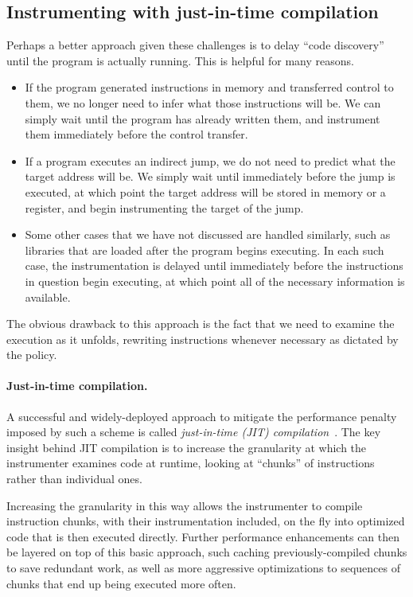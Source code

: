 \documentclass[11pt,twoside]{scrartcl}
\begin{document}
\subsection{Instrumenting with just-in-time compilation}
Perhaps a better approach given these challenges is to delay ``code discovery'' until the program is actually running. This is helpful for many reasons.
\begin{itemize}
\item If the program generated instructions in memory and transferred control to them, we no longer need to infer what those instructions will be. We can simply wait until the program has already written them, and instrument them immediately before the control transfer.
\item If a program executes an indirect jump, we do not need to predict what the target address will be. We simply wait until immediately before the jump is executed, at which point the target address will be stored in memory or a register, and begin instrumenting the target of the jump.
\item Some other cases that we have not discussed are handled similarly, such as libraries that are loaded after the program begins executing. In each such case, the instrumentation is delayed until immediately before the instructions in question begin executing, at which point all of the necessary information is available.
\end{itemize}
The obvious drawback to this approach is the fact that we need to examine the execution as it unfolds, rewriting instructions whenever necessary as dictated by the policy.

\paragraph{Just-in-time compilation.} A successful and widely-deployed approach to mitigate the performance penalty imposed by such a scheme is called \emph{just-in-time (JIT) compilation}~\cite{Aycock2003}. The key insight behind JIT compilation is to increase the granularity at which the instrumenter examines code at runtime, looking at ``chunks'' of instructions rather than individual ones. 

Increasing the granularity in this way allows the instrumenter to compile instruction chunks, with their instrumentation included, on the fly into optimized code that is then executed directly. Further performance enhancements can then be layered on top of this basic approach, such caching previously-compiled chunks to save redundant work, as well as more aggressive optimizations to sequences of chunks that end up being executed more often.
\end{document}
